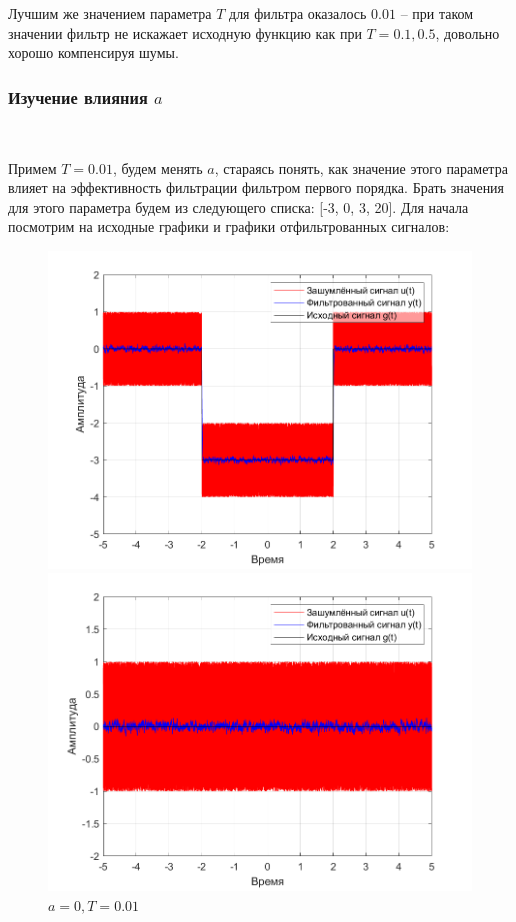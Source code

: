 \documentclass[a4paper]{article}
\begin{document}
Лучшим же значением параметра $T$ для фильтра оказалось $0.01$ -- при таком значении фильтр не искажает исходную функцию как при $T = 0.1, 0.5$, довольно хорошо компенсируя шумы.
\subsubsection{Изучение влияния $a$}\

Примем $T = 0.01$, будем менять $a$, стараясь понять, как значение этого параметра влияет на эффективность фильтрации фильтром первого порядка. Брать значения для этого параметра будем из следующего списка: [-3, 0, 3, 20].
Для начала посмотрим на исходные графики и графики отфильтрованных сигналов: 

\begin{figure}[H]
    \begin{minipage}{0.5\textwidth}
        \centering
        \includegraphics[width=\linewidth]{ex1_1/a=-3_T=0.01/h1.png}
        \caption{$a = -3, T = 0.01$}
    \end{minipage}
    \begin{minipage}{0.5\textwidth}
        \centering
        \includegraphics[width=\linewidth]{ex1_1/a=0_T=0.01/h1.png}
        \caption{$a = 0, T = 0.01$}
    \end{minipage}
\end{figure}
\end{document}
